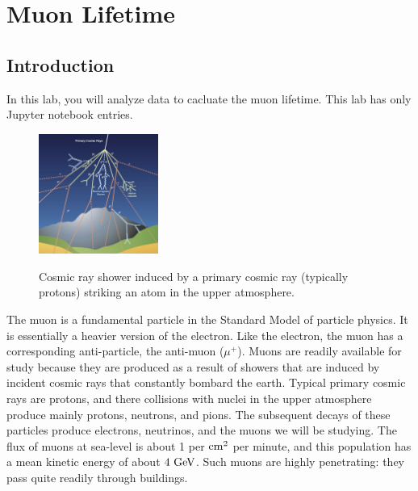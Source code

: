 \chapter{Muon Lifetime}

\section{Introduction}

In this lab, you will analyze data to cacluate the muon lifetime.
This lab has only Jupyter notebook entries.

\begin{figure}[htbp]
\begin{center}
{\includegraphics[width=0.35\textwidth]{figs/labs/muon/cosmic_ray.jpg}}\\
\end{center}
\caption{\label{fig:cosmic}  Cosmic ray shower induced by a primary cosmic ray (typically protons) striking an atom in the upper atmosphere.}\end{figure}

The muon is a fundamental particle in the Standard Model of particle
physics.  It is essentially a heavier version of the electron.  Like
the electron, the muon has a corresponding anti-particle, the
anti-muon ($\mu^+$).  Muons are readily available for study because
they are produced as a result of showers that are induced by incident
cosmic rays that constantly bombard the earth.  Typical primary cosmic
rays are protons, and there collisions with nuclei in the upper
atmosphere produce mainly protons, neutrons, and pions.  The
subsequent decays of these particles produce electrons, neutrinos, and
the muons we will be studying.  The flux of muons at sea-level is
about 1 per ${\rm cm}^2$ per minute, and this population has a mean
kinetic energy of about $4~\rm GeV$.  Such muons are highly
penetrating: they pass quite readily through buildings.

